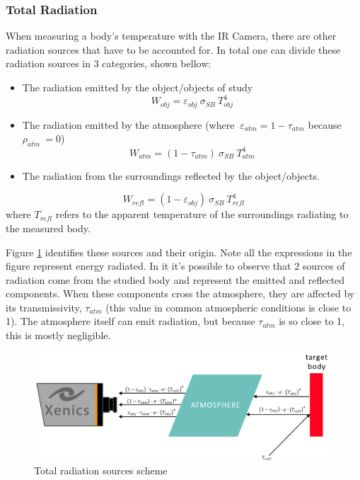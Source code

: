 \subsubsection{Total Radiation}
\par When measuring a body's temperature with the IR Camera, there are other radiation sources that have to be accounted for. In total one can divide these radiation sources in 3 categories, shown bellow:
\begin{itemize}
\item The radiation emitted by the object/objects of study
\begin{equation}
W_{obj}=\varepsilon_{obj} \ \sigma_{SB} \ T_{obj}^4
\end{equation}
\item The radiation emitted by the atmosphere (where $ \ \varepsilon_{atm}=1-\tau_{atm}$ because $\rho_{atm}~=0$)
\begin{equation}
W_{atm}= (1-\tau_{atm}) \ \sigma_{SB} \ T_{atm}^4
\end{equation}
\item The radiation from the surroundings reflected by the object/objects.
\end{itemize}
\begin{equation}
W_{refl}=(1-\varepsilon_{obj}) \ \sigma_{SB} \ T_{refl}^4
\end{equation}
where $T_{refl}$ refers to the apparent temperature of the surroundings radiating to the measured body.\\
\par Figure \ref{fig:camscheme} identifies these sources and their origin. Note all the expressions in the figure represent energy radiated. In it it's possible to observe that 2 sources of radiation come from the studied body and represent the emitted and reflected components. When these components cross the atmosphere, they are affected by its transmissivity, $\tau_{atm}$ (this value in common atmospheric conditions is close to 1). The atmosphere itself can emit radiation, but because $\tau_{atm}$ is so close to 1, this is mostly negligible.\\

\begin{figure}
\includegraphics[width=1\linewidth]{Figures/2.Chapter/ir_camera_radiation_scheme.png}
\caption{Total radiation sources scheme}
\label{fig:camscheme}
\end{figure}

